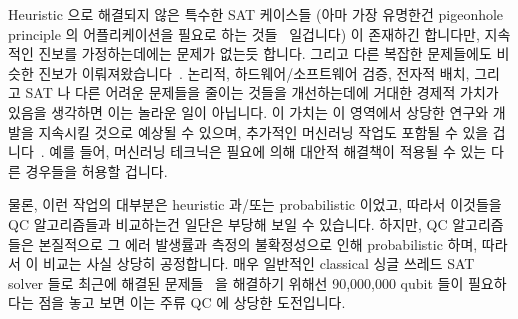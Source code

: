 Heuristic 으로 해결되지 않은 특수한 SAT 케이스들 (아마 가장 유명한건 pigeonhole
principle 의 어플리케이션을 필요로 하는
것들~\cite[page~38]{Kroening:2008:DPA:1391237} 일겁니다) 이 존재하긴 합니다만,
지속적인 진보를 가정하는데에는 문제가 없는듯 합니다.
그리고 다른 복잡한 문제들에도 비슷한 진보가
이뤄져왔습니다~\cite{WikipediaPrimalityTest,WikipediaTSP,WikipediaIntegerFactorization}.
논리적, 하드웨어/소프트웨어 검증, 전자적 배치, 그리고 SAT 나 다른 어려운
문제들을 줄이는 것들을 개선하는데에 거대한 경제적 가치가 있음을 생각하면 이는
놀라운 일이 아닙니다.
이 가치는 이 영역에서 상당한 연구와 개발을 지속시킬 것으로 예상될 수 있으며,
추가적인 머신러닝 작업도 포함될 수 있을
겁니다~\cite{ShaiHaim2009SAT-MachineLearning}.
예를 들어, 머신러닝 테크닉은 필요에 의해 대안적 해결책이 적용될 수 있는 다른
경우들을 허용할 겁니다.

물론, 이런 작업의 대부분은 heuristic 과/또는 probabilistic 이었고, 따라서
이것들을 QC 알고리즘들과 비교하는건 일단은 부당해 보일 수 있습니다.
하지만, QC 알고리즘들은 본질적으로 그 에러 발생률과 측정의 불확정성으로 인해
probabilistic 하며, 따라서 이 비교는 사실 상당히 공정합니다.
매우 일반적인 classical 싱글 쓰레드 SAT solver 들로 최근에 해결된
문제들~\cite{LihaoLiang2016VerifyTreeRCU} 을 해결하기 위해선 90,000,000 qubit
들이 필요하다는 점을 놓고 보면 이는 주류 QC 에 상당한 도전입니다.

